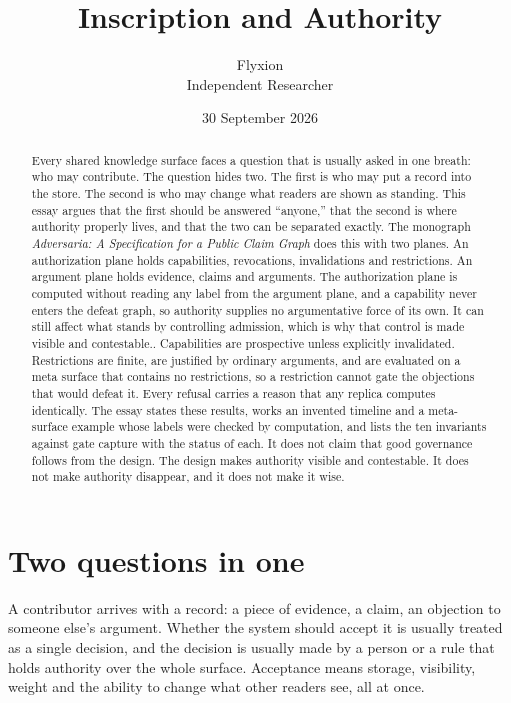 \documentclass[11pt]{article}
\title{Inscription and Authority}
\author{Flyxion\\\small Independent Researcher}
\date{30 September 2026}
\begin{document}
\maketitle

\begin{abstract}
\noindent
Every shared knowledge surface faces a question that is usually asked in one breath: who may contribute. The question hides two. The first is who may put a record into the store. The second is who may change what readers are shown as standing. This essay argues that the first should be answered ``anyone,'' that the second is where authority properly lives, and that the two can be separated exactly. The monograph \emph{Adversaria: A Specification for a Public Claim Graph} does this with two planes. An authorization plane holds capabilities, revocations, invalidations and restrictions. An argument plane holds evidence, claims and arguments. The authorization plane is computed without reading any label from the argument plane, and a capability never enters the defeat graph, so authority supplies no argumentative force of its own. It can still
affect what stands by controlling admission, which is why that control is
made visible and contestable.. Capabilities are prospective unless explicitly invalidated. Restrictions are finite, are justified by ordinary arguments, and are evaluated on a meta surface that contains no restrictions, so a restriction cannot gate the objections that would defeat it. Every refusal carries a reason that any replica computes identically. The essay states these results, works an invented timeline and a meta-surface example whose labels were checked by computation, and lists the ten invariants against gate capture with the status of each. It does not claim that good governance follows from the design. The design makes authority visible and contestable. It does not make authority disappear, and it does not make it wise.
\end{abstract}

\section{Two questions in one}

A contributor arrives with a record: a piece of evidence, a claim, an objection to someone else's argument. Whether the system should accept it is usually treated as a single decision, and the decision is usually made by a person or a rule that holds authority over the whole surface. Acceptance means storage, visibility, weight and the ability to change what other readers see, all at once.
\end{document}

